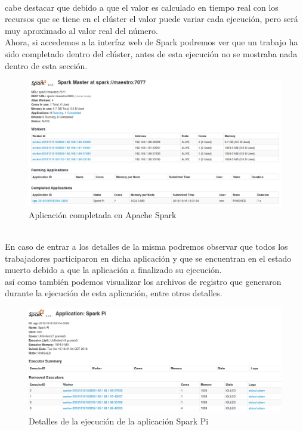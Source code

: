 \\ cabe destacar que debido a que el valor es calculado en tiempo real con los recursos que se tiene en el clúster el valor puede variar cada ejecución, pero será muy aproximado al valor real del número.
\\
Ahora, si accedemos a la interfaz web de Spark podremos ver que un trabajo ha sido completado dentro del clúster, antes de esta ejecución no se mostraba nada dentro de esta sección. \\
\begin{figure}[!htbp]
	\hypertarget{fig:red6}{\hspace{1pt}}
	\begin{center}
		\includegraphics[width=.7\textwidth]{capitulo3/images/im6.png}
		\caption{Aplicación completada en Apache Spark}
		\label{fig:red6}
	\end{center}
\end{figure}
\\ En caso de entrar a los detalles de la misma podremos observar que todos los trabajadores participaron en dicha aplicación y que se encuentran en el estado muerto debido a que la aplicación a finalizado su ejecución. 
\\ así como también podemos visualizar los archivos de registro que generaron durante la ejecución de esta aplicación, entre otros detalles.
\begin{figure}[!htbp]
	\hypertarget{fig:red7}{\hspace{1pt}}
	\begin{center}
		\includegraphics[width=.7\textwidth]{capitulo3/images/im10.png}
		\caption{Detalles de la ejecución de la aplicación Spark Pi}
		\label{fig:red7}
	\end{center}
\end{figure}
